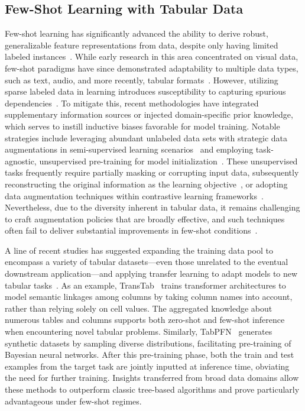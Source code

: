 \subsection{Few-Shot Learning with Tabular Data}  
Few-shot learning has significantly advanced the ability to derive robust, generalizable feature representations from data, despite only having limited labeled instances~\cite{chen2018closer}. While early research in this area concentrated on visual data, few-shot paradigms have since demonstrated adaptability to multiple data types, such as text, audio, and more recently, tabular formats~\cite{majumder2022few,nam2023stunt,schick2021exploiting}. However, utilizing sparse labeled data in learning introduces susceptibility to capturing spurious dependencies~\cite{bartlett2021deep}. To mitigate this, recent methodologies have integrated supplementary information sources or injected domain-specific prior knowledge, which serves to instill inductive biases favorable for model training. Notable strategies include leveraging abundant unlabeled data sets with strategic data augmentations in semi-supervised learning scenarios~\cite{ucar2021subtab,yoon2020vime} and employing task-agnostic, unsupervised pre-training for model initialization~\cite{somepalli2021saint}. These unsupervised tasks frequently require partially masking or corrupting input data, subsequently reconstructing the original information as the learning objective~\cite{arik2021tabnet,majmundar2022met}, or adopting data augmentation techniques within contrastive learning frameworks~\cite{bahri2022scarf,chen2020simple}. Nevertheless, due to the diversity inherent in tabular data, it remains challenging to craft augmentation policies that are broadly effective, and such techniques often fail to deliver substantial improvements in few-shot conditions~\cite{nam2023stunt}.

A line of recent studies has suggested expanding the training data pool to encompass a variety of tabular datasets—even those unrelated to the eventual downstream application—and applying transfer learning to adapt models to new tabular tasks~\cite{zhang2023generative,levin2022transfer,zhu2023xtab}. As an example, TransTab~\cite{wang2022transtab} trains transformer architectures to model semantic linkages among columns by taking column names into account, rather than relying solely on cell values. The aggregated knowledge about numerous tables and columns supports both zero-shot and few-shot inference when encountering novel tabular problems. Similarly, TabPFN~\cite{hollmann2022tabpfn} generates synthetic datasets by sampling diverse distributions, facilitating pre-training of Bayesian neural networks. After this pre-training phase, both the train and test examples from the target task are jointly inputted at inference time, obviating the need for further training. Insights transferred from broad data domains allow these methods to outperform classic tree-based algorithms and prove particularly advantageous under few-shot regimes.

